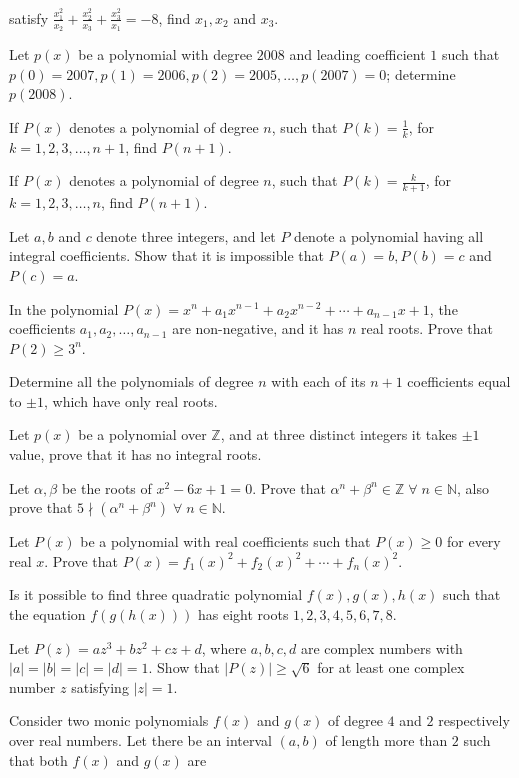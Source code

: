   satisfy $\frac{x_1^2}{x_2} + \frac{x_2^2}{x_3} + \frac{x_3^2}{x_1} = -8$, find $x_1, x_2$ and $x_3$.
\item Let $p(x)$ be a polynomial with degree $2008$ and leading coefficient $1$ such that $p(0) = 2007, p(1)
  = 2006, p(2) = 2005, \ldots, p(2007) = 0$; determine $p(2008)$.
\item If $P(x)$ denotes a polynomial of degree $n$, such that $P(k) = \frac{1}{k}$, for $k = 1, 2, 3,
  \ldots, n + 1$, find $P(n + 1)$.
\item If $P(x)$ denotes a polynomial of degree $n$, such that $P(k) = \frac{k}{k + 1}$, for $k = 1, 2, 3,
  \ldots, n$, find $P(n + 1)$.
\item Let $a, b$ and $c$ denote three integers, and let $P$ denote a polynomial having all integral
  coefficients. Show that it is impossible that $P(a) = b, P(b) = c$ and $P(c) = a$.
\item In the polynomial $P(x) = x^n + a_1x^{n - 1} + a_2x^{n - 2} + \cdots + a_{n - 1}x + 1$, the
  coefficients $a_1, a_2, \ldots, a_{n - 1}$ are non-negative, and it has $n$ real roots. Prove that
  $P(2)\geq 3^n$.
\item Determine all the polynomials of degree $n$ with each of its $n + 1$ coefficients equal to $\pm1$,
  which have only real roots.
\item Let $p(x)$ be a polynomial over $\mathbb{Z}$, and at three distinct integers it takes $\pm 1$ value,
  prove that it has no integral roots.
\item Let $\alpha, \beta$ be the roots of $x^2 - 6x + 1 = 0$. Prove that $\alpha^n + \beta^n
  \in\mathbb{Z}\;\forall\;n\in\mathbb{N}$, also prove that $5\nmid(\alpha^n +
  \beta^n)\;\forall\;n\in\mathbb{N}$.
\item Let $P(x)$ be a polynomial with real coefficients such that $P(x)\geq 0$ for every real $x$. Prove
  that $P(x) = f_1(x)^2 + f_2(x)^2 + \cdots + f_n(x)^2$.
\item Is it possible to find three quadratic polynomial $f(x), g(x), h(x)$ such that the equation
  $f(g(h(x)))$ has eight roots $1, 2, 3, 4, 5, 6, 7, 8$.
\item Let $P(z) = az^3 + bz^2 + cz + d$, where $a, b, c, d$ are complex numbers with $|a| = |b| = |c| = |d|
  = 1$. Show that $|P(z)|\geq \sqrt{6}$ for at least one complex number $z$ satisfying $|z| = 1$.
\item Consider two monic polynomials $f(x)$ and $g(x)$ of degree $4$ and $2$ respectively over real
  numbers. Let there be an interval $(a, b)$ of length more than $2$ such that both $f(x)$ and $g(x)$ are
